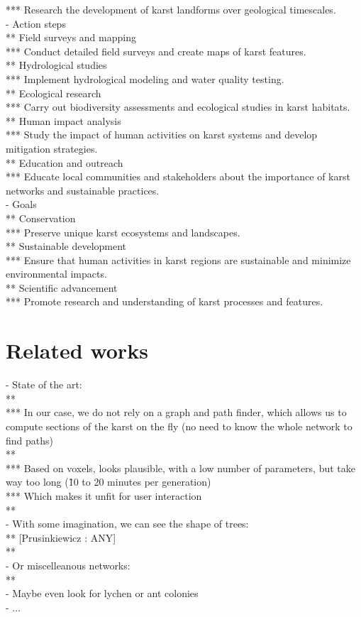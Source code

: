 *** Research the development of karst landforms over geological timescales. \\
- Action steps \\
** Field surveys and mapping \\
*** Conduct detailed field surveys and create maps of karst features. \\
** Hydrological studies \\
*** Implement hydrological modeling and water quality testing. \\
** Ecological research \\
*** Carry out biodiversity assessments and ecological studies in karst habitats. \\
** Human impact analysis \\
*** Study the impact of human activities on karst systems and develop mitigation strategies. \\
** Education and outreach \\
*** Educate local communities and stakeholders about the importance of karst networks and sustainable practices. \\
- Goals \\
** Conservation \\
*** Preserve unique karst ecosystems and landscapes. \\
** Sustainable development \\
*** Ensure that human activities in karst regions are sustainable and minimize environmental impacts. \\
** Scientific advancement \\
*** Promote research and understanding of karst processes and features.

\section{Related works}
\label{sec:karsts_related-works}
- State of the art: \\
** \cite{Paris2021} \\
*** In our case, we do not rely on a graph and path finder, which allows us to compute sections of the karst on the fly (no need to know the whole network to find paths) \\
** \cite{Pytel2015} \\
*** Based on voxels, looks plausible, with a low number of parameters, but take way too long (\~10 to 20 minutes per generation) \\
*** Which makes it unfit for user interaction \\
** \cite{Collon2015,Collon2017} \\
- With some imagination, we can see the shape of trees: \\
** [Prusinkiewicz : ANY] \\
** \cite{Runions2008} \\
- Or miscelleanous networks: \\
** \cite{Galin2010, DiasFernandes2018} \\
- Maybe even look for lychen or ant colonies \\
- ...

